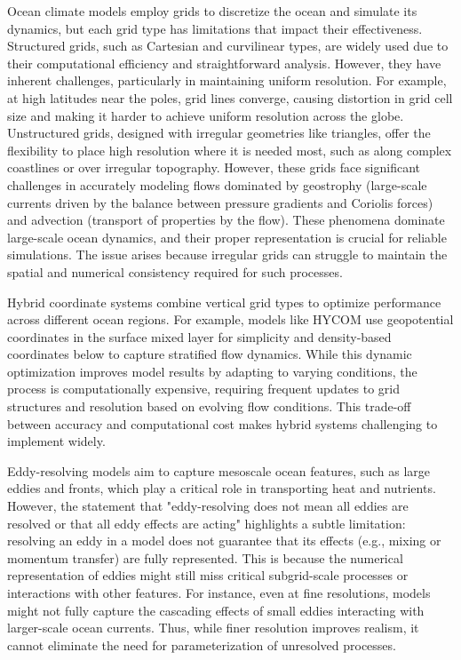 Ocean climate models employ grids to discretize the ocean and simulate its dynamics, but each grid type has limitations that impact their effectiveness. Structured grids, such as Cartesian and curvilinear types, are widely used due to their computational efficiency and straightforward analysis. However, they have inherent challenges, particularly in maintaining uniform resolution. For example, at high latitudes near the poles, grid lines converge, causing distortion in grid cell size and making it harder to achieve uniform resolution across the globe. Unstructured grids, designed with irregular geometries like triangles, offer the flexibility to place high resolution where it is needed most, such as along complex coastlines or over irregular topography. However, these grids face significant challenges in accurately modeling flows dominated by geostrophy (large-scale currents driven by the balance between pressure gradients and Coriolis forces) and advection (transport of properties by the flow). These phenomena dominate large-scale ocean dynamics, and their proper representation is crucial for reliable simulations. The issue arises because irregular grids can struggle to maintain the spatial and numerical consistency required for such processes.

Hybrid coordinate systems combine vertical grid types to optimize performance across different ocean regions. For example, models like HYCOM use geopotential coordinates in the surface mixed layer for simplicity and density-based coordinates below to capture stratified flow dynamics. While this dynamic optimization improves model results by adapting to varying conditions, the process is computationally expensive, requiring frequent updates to grid structures and resolution based on evolving flow conditions. This trade-off between accuracy and computational cost makes hybrid systems challenging to implement widely.

Eddy-resolving models aim to capture mesoscale ocean features, such as large eddies and fronts, which play a critical role in transporting heat and nutrients. However, the statement that "eddy-resolving does not mean all eddies are resolved or that all eddy effects are acting" highlights a subtle limitation: resolving an eddy in a model does not guarantee that its effects (e.g., mixing or momentum transfer) are fully represented. This is because the numerical representation of eddies might still miss critical subgrid-scale processes or interactions with other features. For instance, even at fine resolutions, models might not fully capture the cascading effects of small eddies interacting with larger-scale ocean currents. Thus, while finer resolution improves realism, it cannot eliminate the need for parameterization of unresolved processes.

